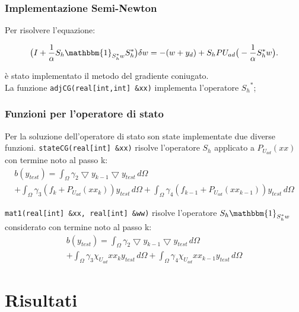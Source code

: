 \documentclass{beamer}
\theoremstyle{definition}
\theoremstyle{remark}
\theoremstyle{plain}
\theoremstyle{definition}
\begin{document}
\begin{frame}
\frametitle{Implementazione Semi-Newton}
Per risolvere l'equazione:

\begin{equation*}
\big( I + \frac{1}{\alpha}S_h\mathbbm{1}_{S^*_hw}S^*_h\big)\delta w=-(w+y_d)+S_hP{U_{ad}}\big( -\frac{1}{\alpha}S^*_hw\big).
\end{equation*}

è stato implementato il metodo del gradiente coniugato.
\\
La funzione \texttt{adjCG(real[int,int] \&xx)} implementa l’operatore ${S_h}^*$; 

\end{frame}

\begin{frame}
\frametitle{Funzioni per l'operatore di stato}
Per la soluzione dell'operatore di stato son state implementate due diverse funzioni.
\texttt{stateCG(real[int] \&xx)} risolve l'operatore $S_h$ applicato a $P_{U_{ad}}(xx)$ con termine noto al passo k:
\begin{multline*}
b(y_{test}) = \int_{\Omega} \gamma_2 \bigtriangledown y_{k-1} \bigtriangledown y_{test} \, d\Omega \\+ \int_{\Omega} \gamma_3 (f_{k}+P_{U_{ad}}(xx_k))y_{test} \, d\Omega + \int_{\Omega} \gamma_4 (f_{k-1}+P_{U_{ad}}(xx_{k-1}))y_{test} \, d\Omega
\end{multline*}

\texttt{mat1(real[int] \&xx, real[int] \&ww)} risolve l'operatore $S_h\mathbbm{1}_{S^*_hw}$ considerato con termine noto al passo k:
\begin{multline*}
b(y_{test}) = \int_{\Omega} \gamma_2 \bigtriangledown y_{k-1} \bigtriangledown y_{test} \, d\Omega \\+ \int_{\Omega} \gamma_3 \chi_{U_{ad}}xx_k y_{test} \, d\Omega + \int_{\Omega} \gamma_4 \chi_{U_{ad}}xx_{k-1} y_{test} \, d\Omega
\end{multline*}

\end{frame}

\section{Risultati}
\end{document}
